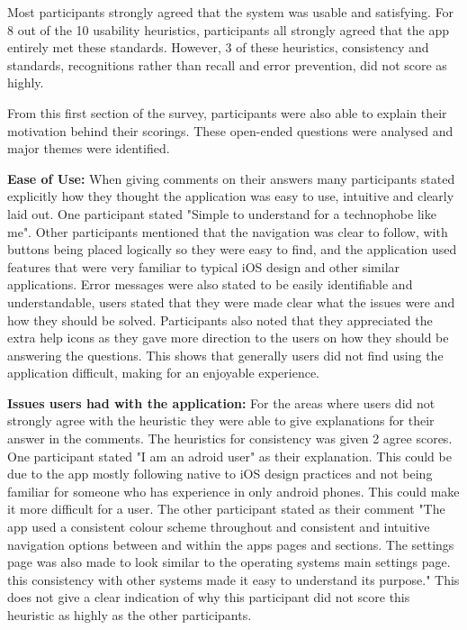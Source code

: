 \documentclass{l4proj}
\begin{document}
Most participants strongly agreed that the system was usable and satisfying. For 8 out of the 10 usability heuristics, participants all strongly agreed that the app entirely met these standards. However, 3 of these heuristics, consistency and standards, recognitions rather than recall and error prevention, did not score as highly.
 
From this first section of the survey, participants were also able to explain their motivation behind their scorings. These open-ended questions were analysed and major themes were identified.

\textbf{Ease of Use:} When giving comments on their answers many participants stated explicitly how they thought the application was easy to use, intuitive and clearly laid out. One participant stated "Simple to understand for a technophobe like me". Other participants mentioned that the navigation was clear to follow, with buttons being placed logically so they were easy to find, and the application used features that were very familiar to typical iOS design and other similar applications. Error messages were also stated to be easily identifiable and understandable, users stated that they were made clear what the issues were and how they should be solved. Participants also noted that they appreciated the extra help icons as they gave more direction to the users on how they should be answering the questions. This shows that generally users did not find using the application difficult, making for an enjoyable experience.

\textbf{Issues users had with the application:} For the areas where users did not strongly agree with the heuristic they were able to give explanations for their answer in the comments. The heuristics for consistency was given 2 agree scores. One participant stated "I am an adroid user" as their explanation. This could be due to the app mostly following native to iOS design practices and not being familiar for someone who has experience in only android phones. This could make it more difficult for a user. The other participant stated as their comment "The app used a consistent colour scheme throughout and consistent and intuitive navigation options between and within the apps pages and sections. The settings page was also made to look similar to the operating systems main settings page. this consistency with other systems made it easy to understand its purpose." This does not give a clear indication of why this participant did not score this heuristic as highly as the other participants.
\end{document}
